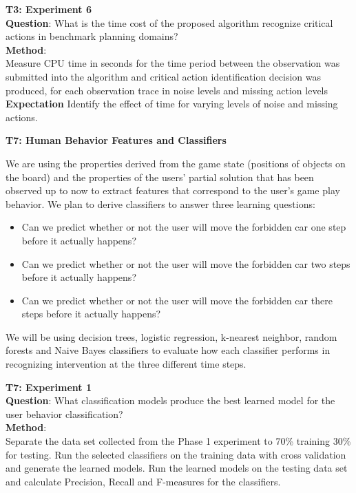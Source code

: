 \documentclass[doctor]{thesis} %
\theoremstyle{plain}
\begin{document}
\textbf{T3: Experiment 6}\\
\textbf{Question}: What is the time cost of the proposed algorithm recognize critical actions in benchmark planning domains?\\
\textbf{Method}:\\
Measure CPU time in seconds for the time period between the observation was submitted into the algorithm and critical action identification decision was produced, for each observation trace in noise levels and missing action levels\\
\textbf{Expectation} Identify the effect of time for varying levels of noise and missing actions.
 






\textbf{T7: Human Behavior Features and Classifiers}

We are using the properties derived from the game state (positions of objects on the board) and the properties of the users' partial solution that has been observed up to now to extract features that correspond to the user's game play behavior. We plan to derive classifiers to answer three learning questions:

\begin{itemize}
\item Can we predict whether or not the user will move the forbidden car one step before it actually happens?
\item Can we predict whether or not the user will move the forbidden car two steps before it actually happens?
\item Can we predict whether or not the user will move the forbidden car there steps before it actually happens?
\end{itemize}

We will be using decision trees, logistic regression, k-nearest neighbor, random forests and Naive Bayes classifiers to evaluate how each classifier performs in recognizing intervention at the three different time steps.

\textbf{T7: Experiment 1}\\
\textbf{Question}: What classification models produce the best learned model for the user behavior classification?\\
\textbf{Method}:\\
Separate the data set collected from the Phase 1 experiment to 70\% training 30\% for testing. Run the selected classifiers on the training data with cross validation and generate the learned models. Run the learned models on the testing data set and calculate Precision, Recall and F-measures for the classifiers.
\end{document}
